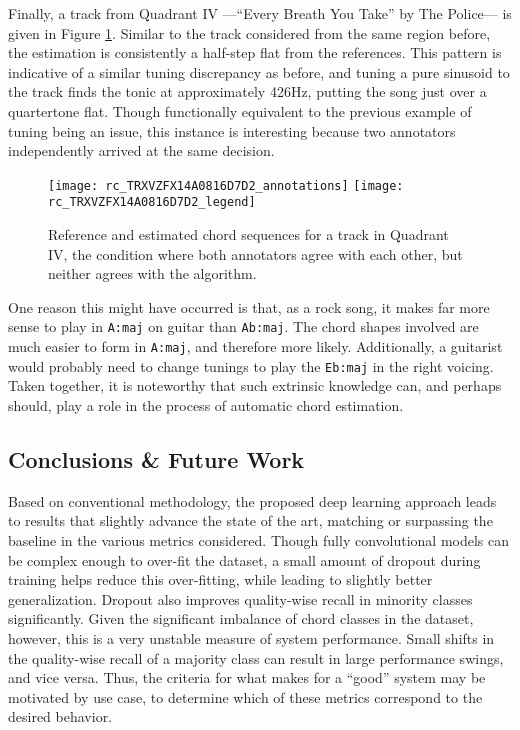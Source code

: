 Finally, a track from Quadrant IV ---``Every Breath You Take'' by The Police--- is given in Figure \ref{fig:rc_quadIV}.
Similar to the track considered from the same region before, the estimation is consistently a half-step flat from the references.
This pattern is indicative of a similar tuning discrepancy as before, and tuning a pure sinusoid to the track finds the tonic at approximately 426Hz, putting the song just over a quartertone flat.
Though functionally equivalent to the previous example of tuning being an issue, this instance is interesting because two annotators independently arrived at the same decision.
\begin{figure}[t!]
\centering
\texttt{[image: rc\_TRXVZFX14A0816D7D2\_annotations]}
\texttt{[image: rc\_TRXVZFX14A0816D7D2\_legend]}
\caption{Reference and estimated chord sequences for a track in Quadrant IV, the condition where both annotators agree with each other, but neither agrees with the algorithm.}
\label{fig:rc_quadIV}
\end{figure}
One reason this might have occurred is that, as a rock song, it makes far more sense to play in \texttt{A:maj} on guitar than \texttt{Ab:maj}.
The chord shapes involved are much easier to form in \texttt{A:maj}, and therefore more likely.
Additionally, a guitarist would probably need to change tunings to play the \texttt{Eb:maj} in the right voicing.
Taken together, it is noteworthy that such extrinsic knowledge can, and perhaps should, play a role in the process of automatic chord estimation.



\subsection{Conclusions \& Future Work}
\label{subsec:conclusions}

Based on conventional methodology, the proposed deep learning approach leads to results that slightly advance the state of the art, matching or surpassing the baseline in the various metrics considered.
Though fully convolutional models can be complex enough to over-fit the dataset, a small amount of dropout during training helps reduce this over-fitting, while leading to slightly better generalization.
Dropout also improves quality-wise recall in minority classes significantly.
Given the significant imbalance of chord classes in the dataset, however, this is a very unstable measure of system performance.
Small shifts in the quality-wise recall of a majority class can result in large performance swings, and vice versa.
Thus, the criteria for what makes for a ``good'' system may be motivated by use case, to determine which of these metrics correspond to the desired behavior.

